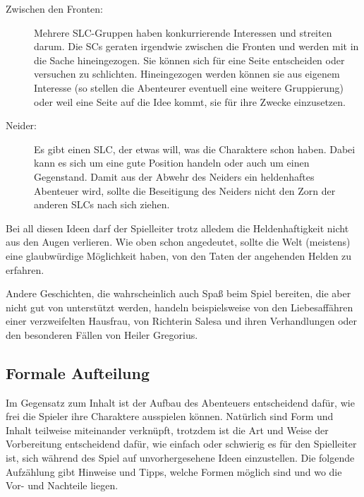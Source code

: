 \begin{description}
\item[Zwischen den Fronten:] Mehrere SLC-Gruppen haben konkurrierende Interessen und streiten darum. Die SCs geraten irgendwie zwischen die Fronten und werden mit in die Sache hineingezogen. Sie können sich für eine Seite entscheiden oder versuchen zu schlichten. Hineingezogen werden können sie aus eigenem Interesse (so stellen die Abenteurer eventuell eine weitere Gruppierung) oder weil eine Seite auf die Idee kommt, sie für ihre Zwecke einzusetzen.

\item[Neider:] Es gibt einen SLC, der etwas will, was die Charaktere schon haben. Dabei kann es sich um eine gute Position handeln oder auch um einen Gegenstand. Damit aus der Abwehr des Neiders ein heldenhaftes Abenteuer wird, sollte die Beseitigung des Neiders nicht den Zorn der anderen SLCs nach sich ziehen.
\end{description}

Bei all diesen Ideen darf der Spielleiter trotz alledem die Heldenhaftigkeit nicht aus den Augen verlieren. Wie oben schon angedeutet, sollte die Welt (meistens) eine glaubwürdige Möglichkeit haben, von den Taten der angehenden Helden zu erfahren.

Andere Geschichten, die wahrscheinlich auch Spaß beim Spiel bereiten, die aber nicht gut von \StoryDSA unterstützt werden, handeln beispielsweise von den Liebesaffähren einer verzweifelten Hausfrau, von Richterin Salesa und ihren Verhandlungen oder den besonderen Fällen von Heiler Gregorius.

\subsection{Formale Aufteilung}
Im Gegensatz zum Inhalt ist der Aufbau des Abenteuers entscheidend dafür, wie frei die Spieler ihre Charaktere ausspielen können. Natürlich sind Form und Inhalt teilweise miteinander verknüpft, trotzdem ist die Art und Weise der Vorbereitung entscheidend dafür, wie einfach oder schwierig es für den Spielleiter ist, sich während des Spiel auf unvorhergesehene Ideen einzustellen. Die folgende Aufzählung gibt Hinweise und Tipps, welche Formen möglich sind und wo die Vor- und Nachteile liegen.

